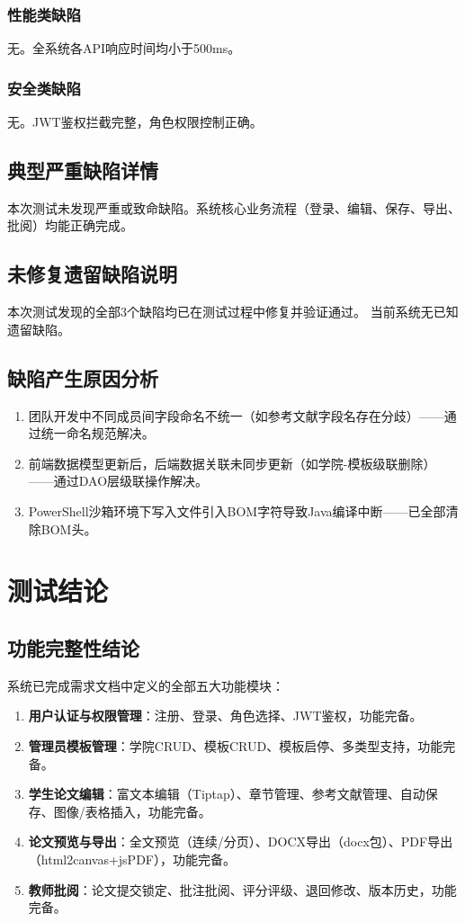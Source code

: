 \documentclass[a4paper,12pt]{article}
\begin{document}
\subsubsection{性能类缺陷}
无。全系统各API响应时间均小于500ms。

\subsubsection{安全类缺陷}
无。JWT鉴权拦截完整，角色权限控制正确。

\subsection{典型严重缺陷详情}
本次测试未发现严重或致命缺陷。系统核心业务流程（登录、编辑、保存、导出、批阅）均能正确完成。

\subsection{未修复遗留缺陷说明}
本次测试发现的全部3个缺陷均已在测试过程中修复并验证通过。
当前系统无已知遗留缺陷。

\subsection{缺陷产生原因分析}
\begin{enumerate}
  \item 团队开发中不同成员间字段命名不统一（如参考文献字段名存在分歧）——通过统一命名规范解决。
  \item 前端数据模型更新后，后端数据关联未同步更新（如学院-模板级联删除）——通过DAO层级联操作解决。
  \item PowerShell沙箱环境下写入文件引入BOM字符导致Java编译中断——已全部清除BOM头。
\end{enumerate}

\section{测试结论}

\subsection{功能完整性结论}
系统已完成需求文档中定义的全部五大功能模块：
\begin{enumerate}
  \item \textbf{用户认证与权限管理}：注册、登录、角色选择、JWT鉴权，功能完备。
  \item \textbf{管理员模板管理}：学院CRUD、模板CRUD、模板启停、多类型支持，功能完备。
  \item \textbf{学生论文编辑}：富文本编辑（Tiptap）、章节管理、参考文献管理、自动保存、图像/表格插入，功能完备。
  \item \textbf{论文预览与导出}：全文预览（连续/分页）、DOCX导出（docx包）、PDF导出（html2canvas+jsPDF），功能完备。
  \item \textbf{教师批阅}：论文提交锁定、批注批阅、评分评级、退回修改、版本历史，功能完备。
\end{enumerate}
\end{document}

